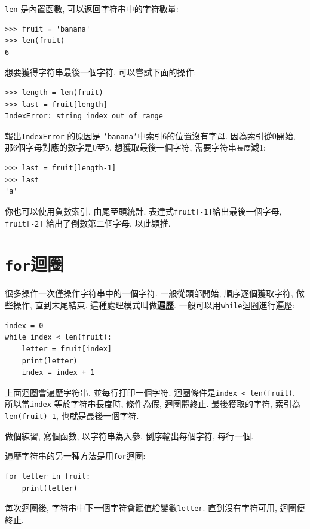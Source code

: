 \documentclass[10pt]{book}
\begin{document}
{\tt len} 是內置函數, 可以返回字符串中的字符數量:

\begin{verbatim}
>>> fruit = 'banana'
>>> len(fruit)
6
\end{verbatim}
%
想要獲得字符串最後一個字符, 可以嘗試下面的操作:

\begin{verbatim}
>>> length = len(fruit)
>>> last = fruit[length]
IndexError: string index out of range
\end{verbatim}
%
報出{\tt IndexError} 的原因是 {\tt 'banana'}中索引6的位置沒有字母. 
因為索引從0開始, 那6個字母對應的數字是0至5.
想獲取最後一個字符, 需要字符串{\tt 長度}減1:

\begin{verbatim}
>>> last = fruit[length-1]
>>> last
'a'
\end{verbatim}
%
你也可以使用負數索引, 由尾至頭統計. 
表達式{\tt fruit[-1]}給出最後一個字母, 
{\tt fruit[-2]} 給出了倒數第二個字母, 以此類推. 


\section{{\tt for}迴圈}
\label{for}
很多操作一次僅操作字符串中的一個字符. 
一般從頭部開始, 順序逐個獲取字符, 做些操作, 直到末尾結束. 
這種處理模式叫做{\bf 遍歷}.
一般可以用{\tt while}迴圈進行遍歷:

\begin{verbatim}
index = 0
while index < len(fruit):
    letter = fruit[index]
    print(letter)
    index = index + 1
\end{verbatim}
%
上面迴圈會遍歷字符串, 並每行打印一個字符. 
迴圈條件是{\tt index < len(fruit)}, 
所以當{\tt index} 等於字符串長度時, 條件為假, 迴圈體終止. 
最後獲取的字符, 索引為{\tt len(fruit)-1}, 也就是最後一個字符. 

做個練習, 寫個函數, 以字符串為入參, 倒序輸出每個字符, 每行一個. 

遍歷字符串的另一種方法是用{\tt for}迴圈:

\begin{verbatim}
for letter in fruit:
    print(letter)
\end{verbatim}
%
每次迴圈後, 字符串中下一個字符會賦值給變數{\tt letter}. 
直到沒有字符可用, 迴圈便終止. 
\end{document}
